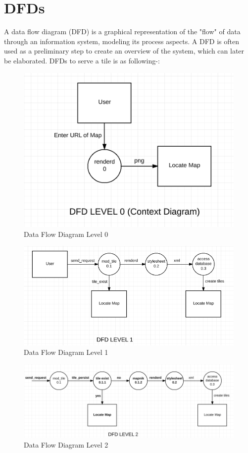 \section{DFDs}
A data flow diagram (DFD) is a graphical representation of the "flow" of data through an information system, modeling its process aspects. A DFD is often used as a preliminary step to create an overview of the system, which can later be elaborated. DFDs to serve a tile is as following-:
\begin{figure}[h!]
\centering
\includegraphics[scale=0.6]{input/images/DFD_0.png}
\caption{Data Flow Diagram Level 0}
\end{figure}
\begin{figure}[h!]
	\centering
	\includegraphics[scale=0.6]{input/images/DFD_1.png}
	\caption{Data Flow Diagram Level 1}
\end{figure}
\begin{figure}[h!]
	\centering
	\includegraphics[scale=0.6]{input/images/DFD_2.png}
	\caption{Data Flow Diagram Level 2}
\end{figure}

